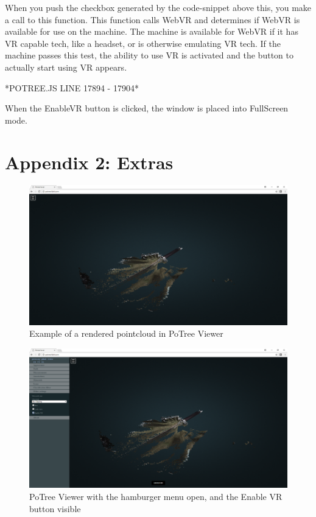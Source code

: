 \documentclass[draftclsnofoot,onecolumn]{IEEEtran}
\begin{document}
When you push the checkbox generated by the code-snippet above this, you make a call to this function.
This function calls WebVR and determines if WebVR is available for use on the machine.
The machine is available for WebVR if it has VR capable tech, like a headset, or is otherwise emulating VR tech.
If the machine passes this test, the ability to use VR is activated and the button to actually start using VR appears.

*POTREE.JS LINE 17894 - 17904*

When the EnableVR button is clicked, the window is placed into FullScreen mode.

\section{Appendix 2: Extras}

\begin{figure}[h]
	\centering
	\includegraphics{NoctVR1}
	\caption{Example of a rendered pointcloud in PoTree Viewer}
\end{figure}

\begin{figure}[h]
	\centering
	\includegraphics{NoctVR2}
	\caption{PoTree Viewer with the hamburger menu open, and the Enable VR button visible}
\end{figure}
\end{document}
